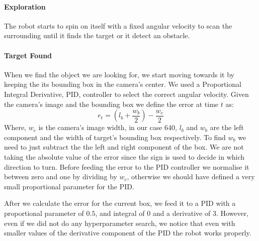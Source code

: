 \documentclass[letterpaper, 10 pt, conference]{ieeeconf}  %
\begin{document}
\paragraph{Exploration} The robot starts to spin on itself with a fixed angular velocity to scan the surrounding until it finds the target or it detect an obstacle.
\paragraph{Target Found} When we find the object we are looking for, we start moving towards it by keeping the its bounding box in the camera's center. We used a Proportional Integral Derivative, PID, controller to select the correct angular velocity. Given the camera's image and the bounding box we define the error at time $t$ as:
\begin{equation}
e_t =  (l_b + \frac{w_b}{2}) - \frac{w_c}{2}
\end{equation}
Where, $w_c$ is the camera's image width, in our case 640, $l_b$ and $w_b$ are the left component and the width of target's bounding box respectively. To find $w_b$ we need to just subtract the the left and right component of the box. We are not taking the absolute value of the error since the sign is used to decide in which direction to turn. Before feeding  the error to the PID controller we normalise it between zero and one by dividing by $w_c$, otherwise we should have defined a very small proportional parameter for the PID. 

After we calculate the error for the current box, we feed it to a PID with a proportional parameter of $0.5$, and integral of $0$ and a derivative of $3$. However, even if we did not do any hyperparameter search, we notice that even with smaller values of the derivative component of the PID the robot works properly. 
\end{document}

